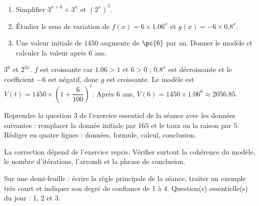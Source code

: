 \begin{exercise}[essentiel]
\begin{enumerate}\item Simplifier $3^{x+6}\div3^x$ et $(2^x)^3$.\item Étudier le sens de variation de $f(x)=6\times\num{1,06}^x$ et $g(x)=-6\times\num{0,8}^x$.\item Une valeur initiale de $1450$ augmente de $\pc{6}$ par an. Donner le modèle et calculer la valeur après $6$ ans.\end{enumerate}
\end{exercise}
\begin{solution}$3^6$ et $2^{3x}$. $f$ est croissante car $\num{1,06}>1$ et $6>0$ ; $\num{0,8}^x$ est décroissante et le coefficient $-6$ est négatif, donc $g$ est croissante. Le modèle est $V(t)=1450\times\left(1+\dfrac{6}{100}\right)^t$. Après $6$ ans, $V(6)=1450\times\num{1,06}^6\approx\num{2056,85}$.\end{solution}


\begin{homework}Reprendre la question 3 de l'exercice essentiel de la séance avec les données suivantes : remplacer la donnée initiale par $165$ et le taux ou la raison par $5$. Rédiger en quatre lignes : données, formule, calcul, conclusion.\end{homework}
\begin{solution}La correction dépend de l'exercice repris. Vérifier surtout la cohérence du modèle, le nombre d'itérations, l'arrondi et la phrase de conclusion.\end{solution}

\begin{exitticket}[3 minutes]Sur une demi-feuille : écrire la règle principale de la séance, traiter un exemple très court et indiquer son degré de confiance de 1 à 4. Question(s) essentielle(s) du jour : 1, 2 et 3.\end{exitticket}

